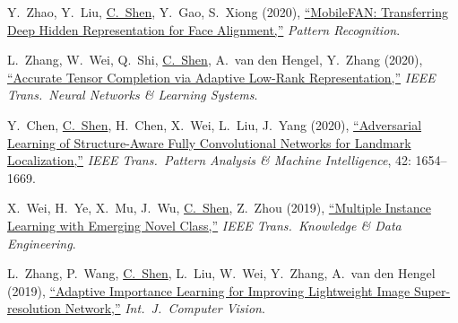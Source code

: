 \documentclass[9pt, a4paper]{article}
\newcommand{\years}[1]{\marginnote{\scriptsize #1}}
\def\highlight{\uline}
\begin{document}
\years{2020} Y.~Zhao, Y.~Liu, \highlight{C.~Shen}, Y.~Gao, S.~Xiong (2020),
\href{http://www.google.com/search?lr=&ie=UTF-8&oe=UTF-8&q=MobileFAN%3A+Transferring+Deep+Hidden+Representation+for+Face+Alignment+Yang+Zhao%2C+Yifan+Liu%2C+Chunhua+Shen%2C+Yongsheng+Gao%2C+Shengwu+Xiong}{``{MobileFAN}: Transferring Deep Hidden Representation for Face Alignment,{}''}
\emph{Pattern Recognition}.

\medskip

\years{2020} L.~Zhang, W.~Wei, Q.~Shi, \highlight{C.~Shen}, A.~van den Hengel, Y.~Zhang (2020),
\href{http://www.google.com/search?lr=&ie=UTF-8&oe=UTF-8&q=Accurate+Tensor+Completion+via+Adaptive+Low-Rank+Representation+Lei+Zhang%2C+Wei+Wei%2C+Qinfeng+Shi%2C+Chunhua+Shen%2C+Anton%0Avan+den+Hengel%2C+Yanning+Zhang}{``Accurate Tensor Completion via Adaptive Low-Rank Representation,{}''}
\emph{IEEE Trans.\  Neural Networks \& Learning Systems}.

\medskip

\years{2020} Y.~Chen, \highlight{C.~Shen}, H.~Chen, X.~Wei, L.~Liu, J.~Yang (2020),
\href{http://www.google.com/search?lr=&ie=UTF-8&oe=UTF-8&q=Adversarial+Learning+of+Structure-Aware+Fully+Convolutional+Networks+for+Landmark+Localization+Yu+Chen%2C+Chunhua+Shen%2C+Hao+Chen%2C+Xiu-Shen+Wei%2C+Lingqiao+Liu%2C+Jian+Yang}{``Adversarial Learning of Structure-Aware Fully Convolutional Networks for Landmark Localization,{}''}
\emph{IEEE Trans.\  Pattern Analysis \& Machine Intelligence}, 42: 1654--1669.

\medskip

\years{2019} X.~Wei, H.~Ye, X.~Mu, J.~Wu, \highlight{C.~Shen}, Z.~Zhou (2019),
\href{http://www.google.com/search?lr=&ie=UTF-8&oe=UTF-8&q=Multiple+Instance+Learning+with+Emerging+Novel+Class+Xiu-Shen+Wei%2C+Han-Jia+Ye%2C+Xin+Mu%2C+Jianxin+Wu%2C+Chunhua+Shen%2C+Zhi-Hua+Zhou}{``Multiple Instance Learning with Emerging Novel Class,{}''}
\emph{IEEE Trans.\  Knowledge \& Data Engineering}.

\medskip

\years{2019} L.~Zhang, P.~Wang, \highlight{C.~Shen}, L.~Liu, W.~Wei, Y.~Zhang, A.~van den Hengel (2019),
\href{http://www.google.com/search?lr=&ie=UTF-8&oe=UTF-8&q=Adaptive+Importance+Learning+for+Improving+Lightweight+Image+Super-resolution+Network+Lei+Zhang%2C+Peng+Wang%2C+Chunhua+Shen%2C+Lingqiao+Liu%2C+Wei+Wei%2C+Yanning+Zhang%2C+Anton+van+den+Hengel}{``Adaptive Importance Learning for Improving Lightweight Image Super-resolution Network,{}''}
\emph{Int.\ J.\  Computer Vision}.
\end{document}
